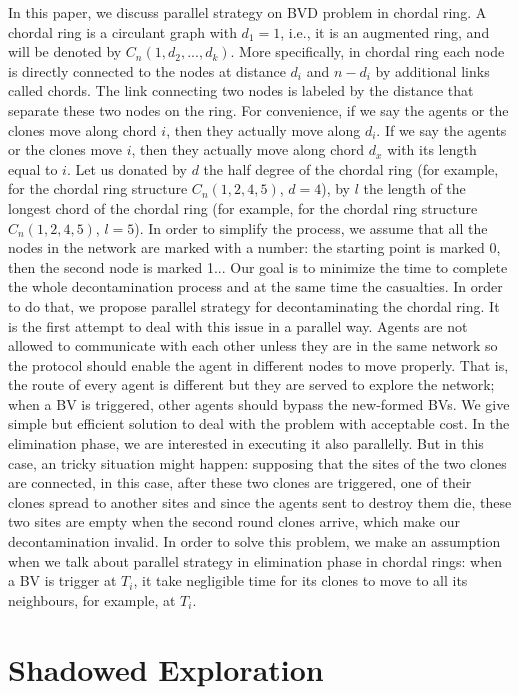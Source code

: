\documentclass[conference]{IEEEtran}
\begin{document}
In this paper, we discuss parallel strategy on BVD problem in chordal ring. A chordal ring is a circulant graph with $d_1=1$, i.e., it is an augmented ring, and will be denoted by $C_n(1, d_2, ..., d_k)$. More specifically, in chordal ring each node is directly connected to the nodes at distance $d_i$ and $n-d_i$ by additional links called chords. The link connecting two nodes is labeled by the distance that separate these two nodes on the ring. 
For convenience, if we say the agents or the clones move along chord $i$, then they actually move along $d_i$. If we say the agents or the clones move $i$, then they actually move along chord $d_x$ with its length equal to $i$. Let us donated by $d$ the half degree of the chordal ring (for example, for the chordal ring structure $C_n(1,2,4,5)$, $d=4$), by $l$ the length of the longest chord of the chordal ring (for example, for the chordal ring structure $C_n(1,2,4,5)$, $l=5$). In order to simplify the process, we assume that all the nodes in the network are marked with a number: the starting point is marked 0, then the second node is marked 1... Our goal is to minimize the time to complete the whole decontamination process and at the same time the casualties. In order to do that, we propose parallel strategy for decontaminating the chordal ring. It is the first attempt to deal with this issue in a parallel way. Agents are not allowed to communicate with each other unless they are in the same network so the protocol should enable the agent in different nodes to move properly. That is, the route of every agent is different but they are served to explore the network; when a BV is triggered, other agents should bypass the new-formed BVs. We give simple but efficient solution to deal with the problem with acceptable cost. 
In the elimination phase, we are interested in executing it also parallelly. But in this case, an tricky situation might happen: supposing that the sites of the two clones are connected, in this case, after these two clones are triggered, one of their clones spread to another sites and since the agents sent to destroy them die, these two sites are empty when the second round clones arrive, which make our decontamination invalid. In order to solve this problem, we make an assumption when we talk about parallel strategy in elimination phase in chordal rings: when a BV is trigger at $T_i$, it take negligible time for its clones to move to all its neighbours, for example, at $T_i$.  

\section{Shadowed Exploration}
\end{document}

